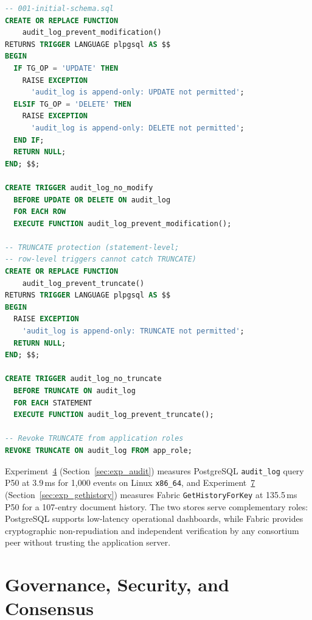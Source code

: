 \documentclass{ieeeaccess}
\begin{document}
\begin{lstlisting}[language=SQL,
    float=!t,
    caption={INSERT-only enforcement on \texttt{audit\_log}.
    Row-level triggers block UPDATE and DELETE; a statement-level
    trigger blocks TRUNCATE (which bypasses row-level triggers in
    PostgreSQL). TRUNCATE privilege is also revoked from application
    roles.},
    label=lst:audittrigger]
-- 001-initial-schema.sql
CREATE OR REPLACE FUNCTION
    audit_log_prevent_modification()
RETURNS TRIGGER LANGUAGE plpgsql AS $$
BEGIN
  IF TG_OP = 'UPDATE' THEN
    RAISE EXCEPTION
      'audit_log is append-only: UPDATE not permitted';
  ELSIF TG_OP = 'DELETE' THEN
    RAISE EXCEPTION
      'audit_log is append-only: DELETE not permitted';
  END IF;
  RETURN NULL;
END; $$;

CREATE TRIGGER audit_log_no_modify
  BEFORE UPDATE OR DELETE ON audit_log
  FOR EACH ROW
  EXECUTE FUNCTION audit_log_prevent_modification();

-- TRUNCATE protection (statement-level;
-- row-level triggers cannot catch TRUNCATE)
CREATE OR REPLACE FUNCTION
    audit_log_prevent_truncate()
RETURNS TRIGGER LANGUAGE plpgsql AS $$
BEGIN
  RAISE EXCEPTION
    'audit_log is append-only: TRUNCATE not permitted';
  RETURN NULL;
END; $$;

CREATE TRIGGER audit_log_no_truncate
  BEFORE TRUNCATE ON audit_log
  FOR EACH STATEMENT
  EXECUTE FUNCTION audit_log_prevent_truncate();

-- Revoke TRUNCATE from application roles
REVOKE TRUNCATE ON audit_log FROM app_role;
\end{lstlisting}

Experiment~\hyperref[sec:exp_audit]{4} (Section~\ref{sec:exp_audit}) measures PostgreSQL
\texttt{audit\_log} query P50 at 3.9\,ms for 1,000 events on Linux
\texttt{x86\_64}, and Experiment~\hyperref[sec:exp_gethistory]{7}
(Section~\ref{sec:exp_gethistory}) measures Fabric
\texttt{GetHistoryForKey} at 135.5\,ms P50 for a 107-entry document
history. The two stores serve complementary roles: PostgreSQL supports
low-latency operational dashboards, while Fabric provides
cryptographic non-repudiation and independent verification by any
consortium peer without trusting the application server.

\section{Governance, Security, and Consensus}
\label{sec:governance_security}
\end{document}
